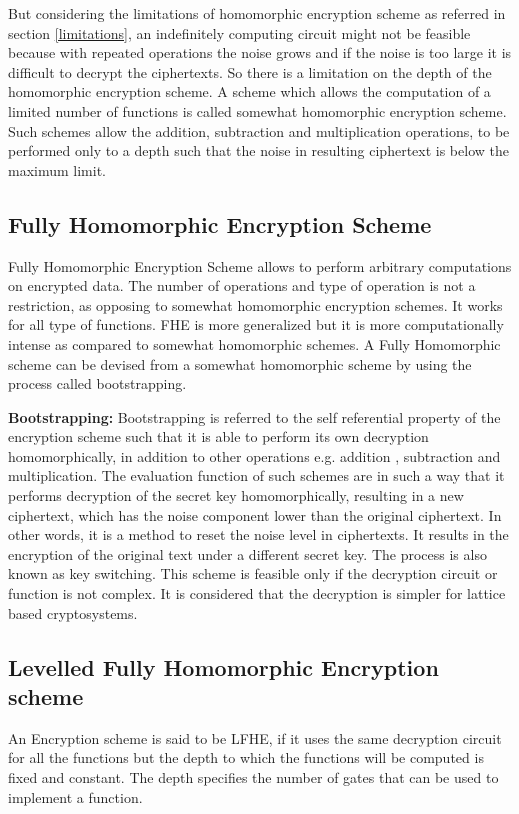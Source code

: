      \noindent But considering the limitations of homomorphic encryption scheme as referred in section \ref{limitations}, an indefinitely computing circuit might not be feasible because with repeated operations the noise grows and if the noise is too large it is difficult to decrypt the ciphertexts. So there is a limitation on the depth of the homomorphic encryption scheme. A scheme which allows the computation of a limited number of functions is called somewhat homomorphic encryption scheme. Such schemes allow the addition, subtraction and multiplication operations, to be performed only to a depth such that the noise in resulting ciphertext is below the maximum limit. 
 \subsection{Fully Homomorphic Encryption Scheme}  
 Fully Homomorphic Encryption Scheme allows to perform arbitrary computations on encrypted data. The number of operations and type of operation is not a restriction, as opposing to somewhat homomorphic encryption schemes. It works for all type of functions. FHE is more generalized but it is more computationally intense as compared to somewhat homomorphic schemes. A Fully Homomorphic scheme can be devised from a somewhat homomorphic scheme by using the process called bootstrapping.

 \vspace{0.25cm}
  \noindent \textbf{Bootstrapping:} Bootstrapping is referred to the self referential property of the encryption scheme such that it is able to perform its own decryption homomorphically, in addition to other operations e.g. addition , subtraction and multiplication. The evaluation function of such schemes are in such a way that it performs decryption of the secret key homomorphically, resulting in a new ciphertext, which has the noise component lower than the original ciphertext. In other words, it is a method to reset the noise level in ciphertexts. It results in the encryption of the original text under a different secret key. The process is also known as key switching. This scheme is feasible only if the decryption circuit or function is not complex. It is considered that the decryption is simpler for lattice based cryptosystems. 
  
\subsection{Levelled Fully Homomorphic Encryption scheme}
An Encryption scheme is said to be LFHE, if it uses the same decryption circuit for all the functions but the depth to which the functions will be computed is fixed and constant. The depth specifies the number of gates that can be used to implement a function. 

